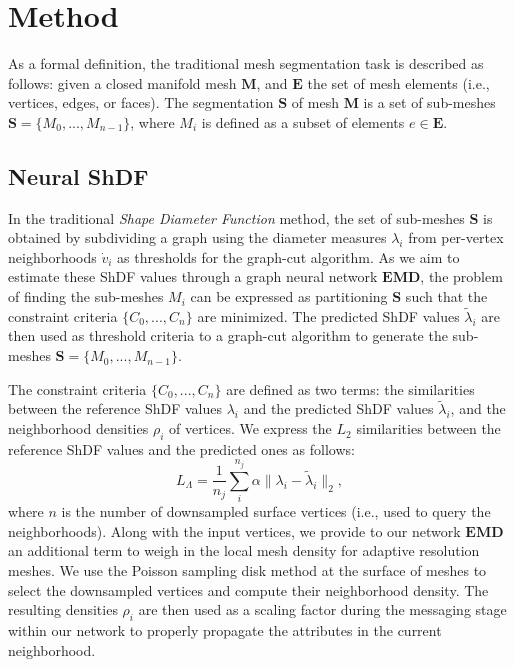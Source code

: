 \section{Method}
As a formal definition, the traditional mesh segmentation task is described as follows: given a closed manifold mesh $\textbf{M}$, and $\textbf{E}$ the set of mesh elements (i.e., vertices, edges, or faces). The segmentation $\textbf{S}$ of mesh $\textbf{M}$ is a set of sub-meshes $\textbf{S}=\{M_0, ..., M_{n-1}\}$, where $M_i$ is defined as a subset of elements $e \in \textbf{E}$.

\subsection{Neural ShDF}
In the traditional \textit{Shape Diameter Function} method, the set of sub-meshes $\textbf{S}$ is obtained by subdividing a graph using the diameter measures $\lambda_i$ from per-vertex neighborhoods $\dot{v}_i$ as thresholds for the graph-cut algorithm. As we aim to estimate these ShDF values through a graph neural network $\textbf{EMD}$, the problem of finding the sub-meshes $M_i$ can be expressed as partitioning $\textbf{S}$ such that the constraint criteria $\{C_0, ..., C_n\}$ are minimized. The predicted ShDF values $\tilde{\lambda}_i$ are then used as threshold criteria to a graph-cut algorithm to generate the sub-meshes $\textbf{S}=\{M_0, ..., M_{n-1}\}$.

The constraint criteria $\{C_0, ..., C_n\}$ are defined as two terms: the similarities between the reference ShDF values $\lambda_i$ and the predicted ShDF values $\tilde{\lambda}_i$, and the neighborhood densities $\rho_i$ of vertices. We express the $L_2$ similarities between the reference ShDF values and the predicted ones as follows:
\begin{equation}
\label{eq:loss_SDF}
L_{\Lambda}=\frac{1}{n_j}\sum_{i}^{n_j}{\alpha\|\lambda_i-\tilde{\lambda}_i\|_2},
\end{equation}
where $n$ is the number of downsampled surface vertices (i.e., used to query the neighborhoods). Along with the input vertices, we provide to our network $\textbf{EMD}$ an additional term to weigh in the local mesh density for adaptive resolution meshes. We use the Poisson sampling disk method at the surface of meshes to select the downsampled vertices and compute their neighborhood density. The resulting densities $\rho_i$ are then used as a scaling factor during the messaging stage within our network to properly propagate the attributes in the current neighborhood.

